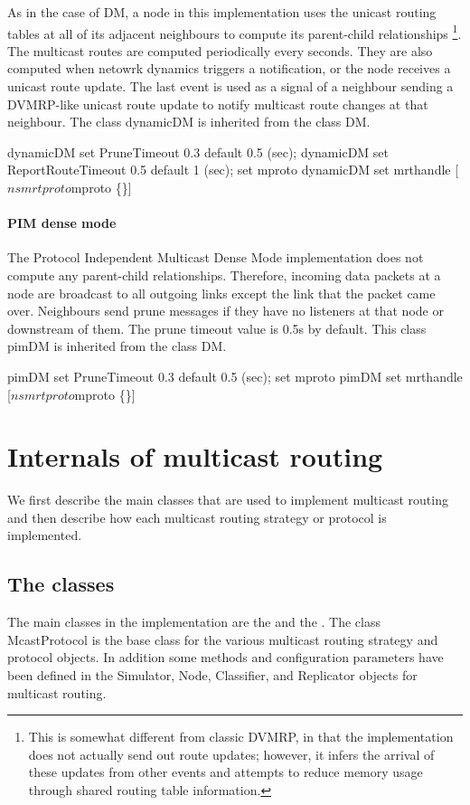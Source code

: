 {As in the case of DM, a node in this implementation uses the
unicast routing tables at all of its adjacent neighbours to
compute its parent-child relationships%
\footnote{This is somewhat different from classic DVMRP, in that
the implementation does not actually send out route updates;
however, it infers the arrival of these updates from other events
and attempts to reduce memory usage through shared routing table information.}.
The multicast routes are computed periodically every
 seconds.
They are also computed when netowrk dynamics triggers a notification,
or the node receives a unicast route update.
The last event is used as a signal of a neighbour sending a 
DVMRP-like unicast route update to notify multicast route changes at that
neighbour.
The class dynamicDM is
inherited from the class DM.
\begin{program}
	dynamicDM set PruneTimeout 0.3           \; default 0.5 (sec);
	dynamicDM set ReportRouteTimeout 0.5  \; default 1 (sec);
	set mproto dynamicDM
	set mrthandle [$ns mrtproto $mproto \{\}]
\end{program}

\paragraph{PIM dense mode}
The Protocol Independent Multicast Dense Mode implementation
does not compute any parent-child relationships.
Therefore, incoming  data packets at a node are broadcast
to all outgoing links except the link that the packet came over.
Neighbours send prune messages if they have no listeners
at that node or downstream of them.
The prune timeout value is 0.5s by default.
This class pimDM is inherited from the class DM.
\begin{program}
        pimDM set PruneTimeout  0.3	\; default 0.5 (sec);
	set mproto pimDM
	set mrthandle [$ns mrtproto $mproto \{\}]
\end{program}

\section{Internals of multicast routing}
\label{sec:mcast-internals}

We first describe the main classes that are used to implement multicast
routing and then describe how each multicast routing strategy
or protocol is implemented.

\subsection{The classes}
The main classes in the implementation are
the  and
the .
The class McastProtocol is the base
class for the various multicast routing strategy and protocol objects.
In addition some methods and configuration parameters have been defined in
the Simulator, Node, Classifier, and Replicator objects for multicast
routing.

}
